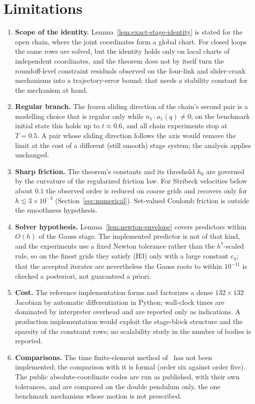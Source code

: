 \section{Limitations}
\label{sec:limitations}

\begin{enumerate}
  \item \textbf{Scope of the identity.} Lemma~\ref{lem:exact-stage-identity} is stated for the open
  chain, where the joint coordinates form a global chart. For closed loops the same rows are solved,
  but the identity holds only on local charts of independent coordinates, and the theorem does not
  by itself turn the roundoff-level constraint residuals observed on the four-link and slider-crank
  mechanisms into a trajectory-error bound; that needs a stability constant for the mechanism at
  hand.
  \item \textbf{Regular branch.} The frozen sliding direction of the chain's second pair is a
  modelling choice that is regular only while $n_1\cdot a_1(q)\neq0$; on the benchmark initial state
  this holds up to $t\approx0.6$, and all chain experiments stop at $T=0.5$. A pair whose sliding
  direction follows the axis would remove the limit at the cost of a different (still smooth) stage
  system; the analysis applies unchanged.
  \item \textbf{Sharp friction.} The theorem's constants and its threshold $h_0$ are governed by the
  curvature of the regularized friction law. For Stribeck velocities below about $0.1$ the observed
  order is reduced on coarse grids and recovers only for $h\lesssim3\times10^{-3}$
  (Section~\ref{sec:numerical}). Set-valued Coulomb friction is outside the smoothness hypothesis.
  \item \textbf{Solver hypothesis.} Lemma~\ref{lem:newton-envelope} covers predictors within $O(h)$
  of the Gauss stage. The implemented predictor is not of that kind, and the experiments use a fixed
  Newton tolerance rather than the $h^7$-scaled rule, so on the finest grids they satisfy (H3) only
  with a large constant $c_\eta$; that the accepted iterates are nevertheless the Gauss roots to
  within $10^{-11}$ is checked a posteriori, not guaranteed a priori.
  \item \textbf{Cost.} The reference implementation forms and factorizes a dense
  $132\times132$ Jacobian by automatic differentiation in Python; wall-clock times are dominated by
  interpreter overhead and are reported only as indications. A production implementation would
  exploit the stage-block structure and the sparsity of the constraint rows; no scalability study
  in the number of bodies is reported.
  \item \textbf{Comparisons.} The time finite-element method of~\cite{chaturvedi2026tfe} has not
  been implemented; the comparison with it is formal (order six against order five). The public
  absolute-coordinate codes are run as published, with their own tolerances, and are compared on the
  double pendulum only, the one benchmark mechanism whose motion is not prescribed.
\end{enumerate}

